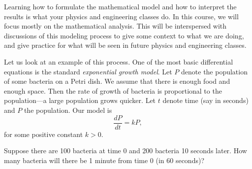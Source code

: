 \documentclass{ximera}
\begin{document}
Learning how to formulate the mathematical model and how to interpret the results is what your physics and engineering classes do.  In this course, we will focus mostly on the mathematical analysis. This will be interspersed with discussions of this modeling process to give some context to what we are doing, and give practice for what will be seen in future physics and engineering classes.

Let us look at  an example of this process. One of the most basic differential equations is the standard \emph{exponential growth model}. Let $P$ denote the population  of some bacteria on a Petri dish.  We assume that there is enough food and enough space.  Then the rate of growth of bacteria is proportional to the population---a large population grows quicker.  Let $t$ denote time (say in seconds) and $P$ the population.  Our model is
\begin{equation*}
    \frac{dP}{dt} = kP ,
\end{equation*}
for some positive constant $k > 0$.

\begin{example}
    Suppose there are 100 bacteria at time 0 and 200 bacteria 10 seconds later. How many bacteria will there be 1 minute from time 0 (in 60 seconds)?
\end{example}
\end{document}

